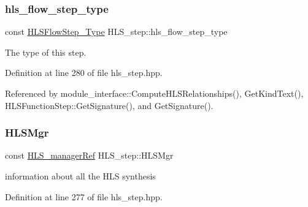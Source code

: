 \mbox{\label{classHLS__step_aefd59af15346ec3f10bf12bd756e6777}} 
\subsubsection{\texorpdfstring{hls\+\_\+flow\+\_\+step\+\_\+type}{hls\_flow\_step\_type}}
{\footnotesize\ttfamily const \hyperlink{hls__step_8hpp_ada16bc22905016180e26fc7e39537f8d}{H\+L\+S\+Flow\+Step\+\_\+\+Type} H\+L\+S\+\_\+step\+::hls\+\_\+flow\+\_\+step\+\_\+type\hspace{0.3cm}{\ttfamily [protected]}}



The type of this step. 



Definition at line 280 of file hls\+\_\+step.\+hpp.



Referenced by module\+\_\+interface\+::\+Compute\+H\+L\+S\+Relationships(), Get\+Kind\+Text(), H\+L\+S\+Function\+Step\+::\+Get\+Signature(), and Get\+Signature().

\mbox{\label{classHLS__step_ade85003a99d34134418451ddc46a18e9}} 
\subsubsection{\texorpdfstring{H\+L\+S\+Mgr}{HLSMgr}}
{\footnotesize\ttfamily const \hyperlink{hls__manager_8hpp_acd3842b8589fe52c08fc0b2fcc813bfe}{H\+L\+S\+\_\+manager\+Ref} H\+L\+S\+\_\+step\+::\+H\+L\+S\+Mgr\hspace{0.3cm}{\ttfamily [protected]}}



information about all the H\+LS synthesis 



Definition at line 277 of file hls\+\_\+step.\+hpp.



